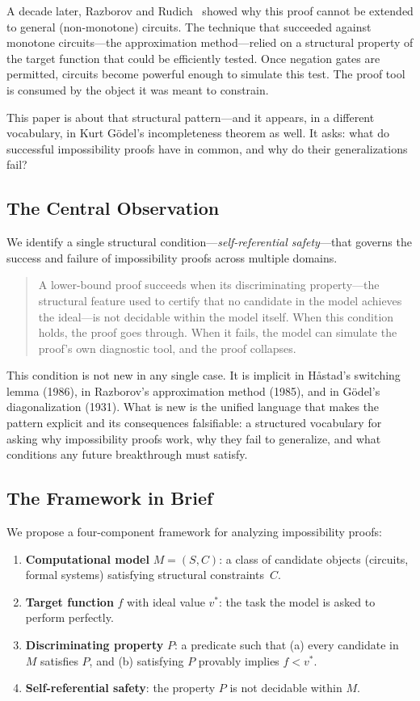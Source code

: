 \documentclass[11pt,a4paper]{article}
\theoremstyle{plain}
\theoremstyle{definition}
\theoremstyle{remark}
\begin{document}
A decade later, Razborov and Rudich~\cite{RazborovRudich1994} showed why this proof cannot be extended to general (non-monotone) circuits. The technique that succeeded against monotone circuits---the approximation method---relied on a structural property of the target function that could be efficiently tested. Once negation gates are permitted, circuits become powerful enough to simulate this test. The proof tool is consumed by the object it was meant to constrain.

This paper is about that structural pattern---and it appears, in a different vocabulary, in Kurt G\"{o}del's incompleteness theorem as well. It asks: what do successful impossibility proofs have in common, and why do their generalizations fail?

\subsection{The Central Observation}

We identify a single structural condition---\emph{self-referential safety}---that governs the success and failure of impossibility proofs across multiple domains.

\begin{quote}
A lower-bound proof succeeds when its discriminating property---the structural feature used to certify that no candidate in the model achieves the ideal---is not decidable within the model itself. When this condition holds, the proof goes through. When it fails, the model can simulate the proof's own diagnostic tool, and the proof collapses.
\end{quote}

This condition is not new in any single case. It is implicit in H\r{a}stad's switching lemma (1986), in Razborov's approximation method (1985), and in G\"{o}del's diagonalization (1931). What is new is the unified language that makes the pattern explicit and its consequences falsifiable: a structured vocabulary for asking why impossibility proofs work, why they fail to generalize, and what conditions any future breakthrough must satisfy.

\subsection{The Framework in Brief}

We propose a four-component framework for analyzing impossibility proofs:

\begin{enumerate}
\item \textbf{Computational model} $M = (S, C)$: a class of candidate objects (circuits, formal systems) satisfying structural constraints~$C$.
\item \textbf{Target function} $f$ with ideal value $v^*$: the task the model is asked to perform perfectly.
\item \textbf{Discriminating property} $P$: a predicate such that (a) every candidate in $M$ satisfies $P$, and (b) satisfying $P$ provably implies $f < v^*$.
\item \textbf{Self-referential safety}: the property $P$ is not decidable within $M$.
\end{enumerate}
\end{document}
